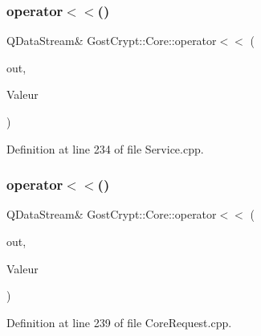 \subsubsection{\texorpdfstring{operator$<$$<$()}{operator<<()}\hspace{0.1cm}{\footnotesize\ttfamily [46/56]}}
{\footnotesize\ttfamily Q\+Data\+Stream\& Gost\+Crypt\+::\+Core\+::operator$<$$<$ (\begin{DoxyParamCaption}\item[{Q\+Data\+Stream \&}]{out,  }\item[{const \hyperlink{struct_gost_crypt_1_1_core_1_1_progress_update_response}{Progress\+Update\+Response} \&}]{Valeur }\end{DoxyParamCaption})}



Definition at line 234 of file Service.\+cpp.

\mbox{\label{namespace_gost_crypt_1_1_core_adfe52f393b0b39b0dea12862d4f5d967}} 
\subsubsection{\texorpdfstring{operator$<$$<$()}{operator<<()}\hspace{0.1cm}{\footnotesize\ttfamily [47/56]}}
{\footnotesize\ttfamily Q\+Data\+Stream\& Gost\+Crypt\+::\+Core\+::operator$<$$<$ (\begin{DoxyParamCaption}\item[{Q\+Data\+Stream \&}]{out,  }\item[{const \hyperlink{struct_gost_crypt_1_1_core_1_1_get_derivation_functions_request}{Get\+Derivation\+Functions\+Request} \&}]{Valeur }\end{DoxyParamCaption})}



Definition at line 239 of file Core\+Request.\+cpp.

\mbox{\label{namespace_gost_crypt_1_1_core_acb630df5e59edeeb348987205d80bb44}} 
